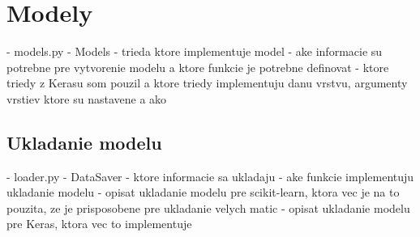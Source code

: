 
\section{Modely}
\label{sec:modely}
- models.py - Models
- trieda ktore implementuje model
- ake informacie su potrebne pre vytvorenie modelu a ktore funkcie je potrebne definovat
- ktore triedy z Kerasu som pouzil a ktore triedy implementuju danu vrstvu, argumenty vrstiev ktore su nastavene a ako

\subsection{Ukladanie modelu}
\label{subsec:ukladaniemodelu}
- loader.py - DataSaver
- ktore informacie sa ukladaju
- ake funkcie implementuju ukladanie modelu
- opisat ukladanie modelu pre scikit-learn, ktora vec je na to pouzita, ze je prisposobene pre ukladanie velych matic
- opisat ukladanie modelu pre Keras, ktora vec to implementuje
